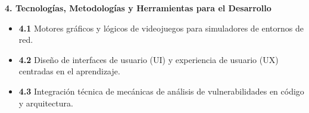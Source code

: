\noindent\textbf{4. Tecnologías, Metodologías y Herramientas para el Desarrollo}
\begin{itemize}
    \item \textbf{4.1} Motores gráficos y lógicos de videojuegos para simuladores de entornos de red.
    \item \textbf{4.2} Diseño de interfaces de usuario (UI) y experiencia de usuario (UX) centradas en el aprendizaje.
    \item \textbf{4.3} Integración técnica de mecánicas de análisis de vulnerabilidades en código y arquitectura.
\end{itemize}